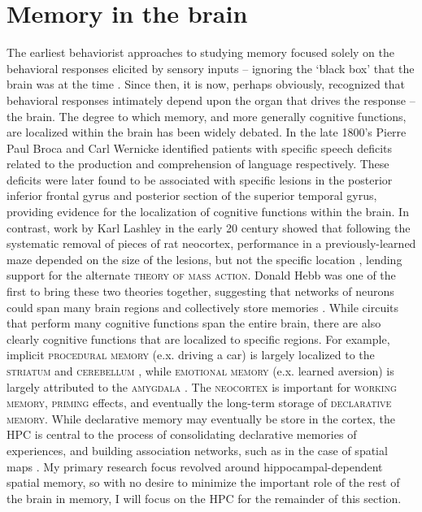 \section{Memory in the brain}
\label{sec:intro:memory:structure}
The earliest behaviorist approaches to studying memory focused solely on the behavioral responses elicited by sensory inputs -- ignoring the `black box' that the brain was at the time \citep{Watson1913}.
Since then, it is now, perhaps obviously, recognized that behavioral responses intimately depend upon the organ that drives the response -- the brain.
The degree to which memory, and more generally cognitive functions, are localized within the brain has been widely debated.
In the late 1800's Pierre Paul Broca and Carl Wernicke identified patients with specific speech deficits related to the production and comprehension of language respectively.
These deficits were later found to be associated with specific lesions in the posterior inferior frontal gyrus and posterior section of the superior temporal gyrus, providing evidence for the localization of cognitive functions within the brain.
In contrast, work by Karl Lashley in the early 20 century showed that following the systematic removal of pieces of rat neocortex, performance in a previously-learned maze depended on the size of the lesions, but not the specific location \citep{Lashley1929}, lending support for the alternate \textsc{theory of mass action}.
Donald Hebb was one of the first to bring these two theories together, suggesting that networks of neurons could span many brain regions and collectively store memories \citep{Hebb1949}.
While circuits that perform many cognitive functions span the entire brain, there are also clearly cognitive functions that are localized to specific regions.
For example, implicit \textsc{procedural memory} (e.x. driving a car) is largely localized to the \textsc{striatum} and \textsc{cerebellum} \citep{Knowlton1996, Gerwig2007, Eichenbaum2000}, while \textsc{emotional memory} (e.x. learned aversion) is largely attributed to the \textsc{amygdala} \citep{LeDoux2000}.
The \textsc{neocortex} is important for \textsc{working memory}, \textsc{priming} effects, and eventually the long-term storage of \textsc{declarative memory}.
While declarative memory may eventually be store in the cortex, the \ac{HPC} is central to the process of consolidating declarative memories of experiences, and building association networks, such as in the case of spatial maps \citep{Eichenbaum2000}.
My primary research focus revolved around hippocampal-dependent spatial memory, so with no desire to minimize the important role of the rest of the brain in memory, I will focus on the \ac{HPC} for the remainder of this section. 

